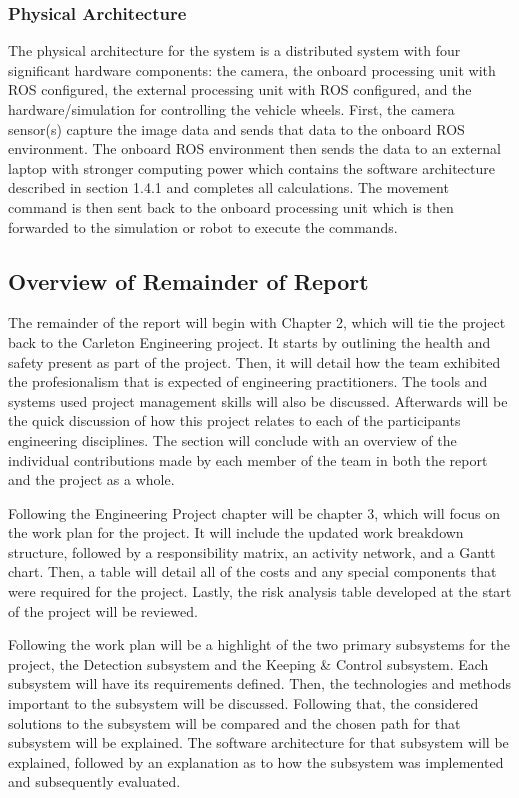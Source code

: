 \documentclass[titlepage]{article}
\begin{document}
\subsubsection{Physical Architecture}

The physical architecture for the system is a distributed system with four  significant hardware components: the camera, the onboard processing unit with ROS configured, the external processing unit with ROS configured, and the hardware/simulation for controlling the vehicle wheels. First, the camera sensor(s) capture the image data and sends that data to the onboard ROS environment. The onboard ROS environment then sends the data to an external laptop with stronger computing power which contains the software architecture described in section 1.4.1 and completes all calculations. The movement command is then sent back to the onboard processing unit which is then forwarded to the simulation or robot to execute the commands. 

\subsection{Overview of Remainder of Report}

The remainder of the report will begin with Chapter 2, which will tie the project back to the Carleton Engineering project. It starts by outlining the health and safety present as part of the project.  Then, it will detail how the team exhibited the profesionalism that is expected of engineering practitioners. The tools and systems used project management skills will also be discussed. Afterwards will be the quick discussion of how this project relates to each of the participants engineering disciplines. The section will conclude with an overview of the individual contributions made by each member of the team in both the report and the project as a whole. 

Following the Engineering Project chapter will be chapter 3, which will focus on the work plan for the project. It will include the updated work breakdown structure, followed by a responsibility matrix, an activity network, and a Gantt chart. Then, a table will detail all of the costs and any special components that were required for the project. Lastly, the risk analysis table developed at the start of the project will be reviewed.

Following the work plan will be a highlight of the two primary subsystems for the project, the Detection subsystem and the Keeping \& Control subsystem. Each subsystem will have its requirements defined. Then, the technologies and methods important to the subsystem will be discussed. Following that, the considered solutions to the subsystem will be compared and the chosen path for that subsystem will be explained. The software architecture for that subsystem will be explained, followed by an explanation as to how the subsystem was implemented and subsequently evaluated.
\end{document}
